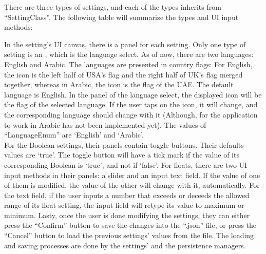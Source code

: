 There are three types of settings, and each of the types inherits from “{\codefont SettingClass}”. The following table will summarize the types and UI input methods:

\begin{table}[H]
\centering
{}
\end{table}
In the setting's UI canvas, there is a panel for each setting. Only one type of setting is an , which is the language select. As of now, there are two languages: English and Arabic. The languages are presented in country flags: For English, the icon is the left half of USA's flag and the right half of UK's flag merged together, whereas in Arabic, the icon is the flag of the UAE. The default language is English. In the panel of the language select, the displayed icon will be the flag of the selected language. If the user taps on the icon, it will change, and the corresponding language should change with it (Although, for the application to work in Arabic has not been implemented yet). The values of “{\codefont LanguageEnum}” are ‘{\codefont English}’ and ‘{\codefont Arabic}’.\\

For the Boolean settings, their panels contain toggle buttons. Their defaults values are ‘{\codefont true}’. The toggle button will have a tick mark if the value of its corresponding Boolean is ‘{\codefont true}’, and not if ‘{\codefont false}’. For floats, there are two UI input methods in their panels: a slider and an input text field. If the value of one of them is modified, the value of the other will change with it, automatically. For the text field, if the user inputs a number that exceeds or deceeds the allowed range of its float setting, the input field will retype its value to maximum or minimum. Lasty, once the user is done modifying the settings, they can either press the “Confirm” button to save the changes into the “.json” file, or press the “Cancel” button to load the previous settings' values from the file. The loading and saving processes are done by the settings' and the persistence managers.

